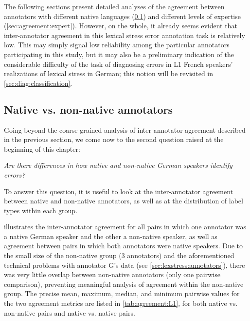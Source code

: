 			The following sections present detailed analyses of the agreement between annotators with different native languages (\cref{sec:agreement:native}) and different levels of expertise (\cref{sec:agreement:expert}).  However, on the whole, it already seems evident that inter-annotator agreement in this lexical stress error annotation task is relatively low. This may simply signal low reliability among the particular annotators participating in this study, but it may also be a preliminary indication of the considerable difficulty of the task of diagnosing errors in L1 French speakers' realizations of lexical stress in German; this notion will be revisited in \cref{sec:diag:classification}. 

	
	
		\subsection{Native vs. non-native annotators}
		\label{sec:agreement:native}

		
		
		Going beyond the coarse-grained analysis of inter-annotator agreement described in the previous section, we come now to the second question raised at the beginning of this chapter:
		
		\textit{Are there differences in how native and non-native German speakers identify errors?}
		
		
		To answer this question, it is useful to look at the inter-annotator agreement between native and non-native annotators, as well as at the distribution of label types within each group. 
		
		 illustrates the inter-annotator agreement for all pairs in which one annotator was a native German speaker and the other a non-native speaker, as well as agreement between pairs in which both annotators were native speakers. Due to the small size of the non-native group (3 annotators) and the aforementioned technical problems with annotator G's data (see \cref{sec:lexstress:annotators}), there was very little overlap between non-native annotators (only one pairwise comparison), preventing meaningful analysis of agreement within the non-native group. The precise mean, maximum, median, and minimum pairwise values for the two agreement metrics are listed in \cref{tab:agreement:L1}, for both  native vs. non-native pairs and native vs. native pairs. 
		
